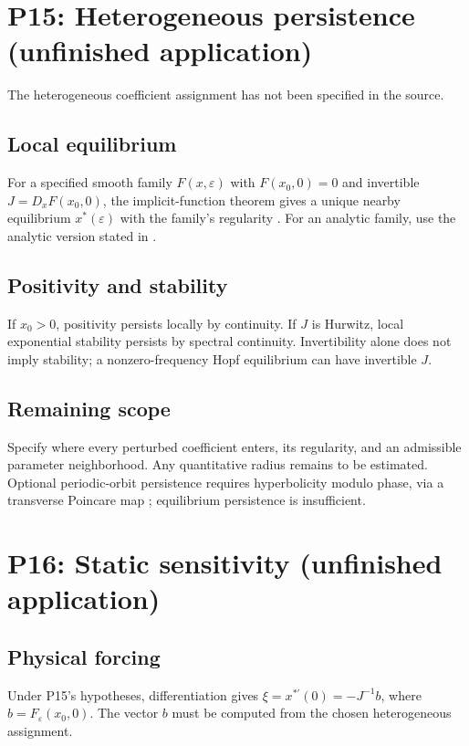 \documentclass[11pt]{article}
\let\OriginalCite\cite
\renewcommand{\cite}[2][]{%
  \textcolor{CitationRed}{%
    \if\relax\detokenize{#1}\relax
      \OriginalCite{#2}%
    \else
      \OriginalCite[#1]{#2}%
    \fi}}
\newcommand{\eps}{\varepsilon}
\theoremstyle{definition}
\theoremstyle{remark}
\begin{document}
\section{P15: Heterogeneous persistence (unfinished application)}
\label{sec:P15}
The heterogeneous coefficient assignment has not been specified in the source.
\subsection{Local equilibrium}\label{slot:P15-1}
For a specified smooth family $F(x,\eps)$ with $F(x_0,0)=0$ and
invertible $J=D_xF(x_0,0)$, the implicit-function theorem gives a
unique nearby equilibrium $x^*(\eps)$ with the family's regularity
\cite[Ch.~1]{GuckenheimerHolmes1983}. For an analytic family, use the
analytic version stated in \cite[\S3.2]{GreenbaumLiOverton2020}.
\subsection{Positivity and stability}\label{slot:P15-2}
If $x_0>0$, positivity persists locally by continuity. If $J$ is
Hurwitz, local exponential stability persists by spectral continuity.
Invertibility alone does not imply stability; a nonzero-frequency Hopf
equilibrium can have invertible $J$.
\subsection{Remaining scope}\label{slot:P15-3}
Specify where every perturbed coefficient enters, its regularity, and an
admissible parameter neighborhood. Any quantitative radius remains to be
estimated. Optional periodic-orbit persistence requires hyperbolicity
modulo phase, via a transverse Poincare map
\cite[Ch.~1]{GuckenheimerHolmes1983}; equilibrium persistence is insufficient.


\section{P16: Static sensitivity (unfinished application)}
\label{sec:P16}
\subsection{Physical forcing}\label{slot:P16-1}
Under P15's hypotheses, differentiation gives
$\xi=x^{*\prime}(0)=-J^{-1}b$, where $b=F_\eps(x_0,0)$.
The vector $b$ must be computed from the chosen heterogeneous assignment.
\end{document}
